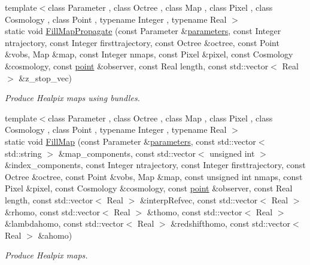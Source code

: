 \begin{DoxyCompactItemize}
{\footnotesize template$<$class Parameter , class Octree , class Map , class Pixel , class Cosmology , class Point , typename Integer , typename Real $>$ }\\static void \hyperlink{classHmaps_a2d730259558142f226ee3173933a8c8d}{Fill\-Map\-Propagate} (const Parameter \&\hyperlink{rays_8h_ae1bc8b0b8c8b9f8e4cc61a5cc7c4ce9e}{parameters}, const Integer ntrajectory, const Integer firsttrajectory, const Octree \&octree, const Point \&vobs, Map \&map, const Integer nmaps, const Pixel \&pixel, const Cosmology \&cosmology, const \hyperlink{miscellaneous_8h_af4785a592bbb7b2a8882c18bb0101192}{point} \&observer, const Real length, const std\-::vector$<$ Real $>$ \&z\-\_\-stop\-\_\-vec)
\begin{DoxyCompactList}\small\item\em Produce Healpix maps using bundles. \end{DoxyCompactList}\item 
{\footnotesize template$<$class Parameter , class Octree , class Map , class Pixel , class Cosmology , class Point , typename Integer , typename Real $>$ }\\static void \hyperlink{classHmaps_a663094978d63b65003d82d34536d8034}{Fill\-Map} (const Parameter \&\hyperlink{rays_8h_ae1bc8b0b8c8b9f8e4cc61a5cc7c4ce9e}{parameters}, const std\-::vector$<$ std\-::string $>$ \&map\-\_\-components, const std\-::vector$<$ unsigned int $>$ \&index\-\_\-components, const Integer ntrajectory, const Integer firsttrajectory, const Octree \&octree, const Point \&vobs, Map \&map, const unsigned int nmaps, const Pixel \&pixel, const Cosmology \&cosmology, const \hyperlink{miscellaneous_8h_af4785a592bbb7b2a8882c18bb0101192}{point} \&observer, const Real length, const std\-::vector$<$ Real $>$ \&interp\-Refvec, const std\-::vector$<$ Real $>$ \&rhomo, const std\-::vector$<$ Real $>$ \&thomo, const std\-::vector$<$ Real $>$ \&lambdahomo, const std\-::vector$<$ Real $>$ \&redshifthomo, const std\-::vector$<$ Real $>$ \&ahomo)
\begin{DoxyCompactList}\small\item\em Produce Healpix maps. \end{DoxyCompactList}\end{DoxyCompactItemize}


